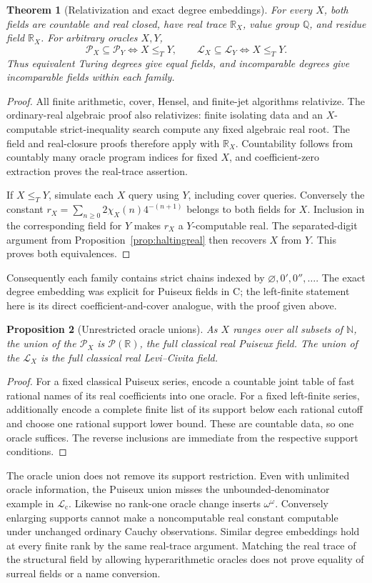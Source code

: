 \documentclass[11pt,letterpaper]{article}
\numberwithin{equation}{section}
\newtheorem{theorem}{Theorem}[section]
\newtheorem{proposition}[theorem]{Proposition}
\theoremstyle{definition}
\theoremstyle{remark}
\newcommand{\PP}{\mathcal P}
\newcommand{\Lc}{\mathcal L_{\mathrm c}}
\newcommand{\Q}{\mathbb Q}
\newcommand{\R}{\mathbb R}
\newcommand{\N}{\mathbb N}
\begin{document}
\begin{theorem}[Relativization and exact degree embeddings]
\label{thm:oracle-fields}
For every $X$, both fields are countable and real closed, have real trace
$\R_X$, value group $\Q$, and residue field $\R_X$.
For arbitrary oracles $X,Y$,
\[
 \mathcal P_X\subseteq\mathcal P_Y\iff X\le_TY,
 \qquad
 \mathcal L_X\subseteq\mathcal L_Y\iff X\le_TY.
\]
Thus equivalent Turing degrees give equal fields, and incomparable degrees
give incomparable fields within each family.
\end{theorem}
\begin{proof}
All finite arithmetic, cover, Hensel, and finite-jet algorithms relativize.
The ordinary-real algebraic proof also relativizes: finite isolating data
and an $X$-computable strict-inequality search compute any fixed algebraic
real root. The field and real-closure proofs therefore apply with $\R_X$.
Countability follows from countably many oracle program indices for fixed
$X$, and coefficient-zero extraction proves the real-trace assertion.

If $X\le_TY$, simulate each $X$ query using $Y$, including cover queries.
Conversely the constant
$r_X=\sum_{n\ge0}2\chi_X(n)4^{-(n+1)}$ belongs to both fields for $X$.
Inclusion in the corresponding field for $Y$ makes $r_X$ a $Y$-computable
real. The separated-digit argument from Proposition~\ref{prop:haltingreal}
then recovers $X$ from $Y$. This proves both equivalences.
\end{proof}
Consequently each family contains strict chains indexed by
$\varnothing,0',0'',\ldots$. The exact degree embedding was explicit for
Puiseux fields in C; the left-finite statement here is its direct
coefficient-and-cover analogue, with the proof given above.

\begin{proposition}[Unrestricted oracle unions]
\label{prop:oracle-unions}
As $X$ ranges over all subsets of $\N$, the union of the $\mathcal P_X$ is
$\PP(\R)$, the full classical real Puiseux field. The union of the
$\mathcal L_X$ is the full classical real Levi--Civita field.
\end{proposition}
\begin{proof}
For a fixed classical Puiseux series, encode a countable joint table of
fast rational names of its real coefficients into one oracle. For a fixed
left-finite series, additionally encode a complete finite list of its support
below each rational cutoff and choose one rational support lower bound.
These are countable data, so one oracle suffices. The reverse inclusions
are immediate from the respective support conditions.
\end{proof}
The oracle union does not remove its support restriction. Even with unlimited
oracle information, the Puiseux union misses the unbounded-denominator
example in $\Lc$. Likewise no rank-one oracle change inserts $\omega^\omega$.
Conversely enlarging supports cannot make a noncomputable real constant
computable under unchanged ordinary Cauchy observations. Similar degree
embeddings hold at every finite rank by the same real-trace argument.
Matching the real trace of the structural field by allowing hyperarithmetic
oracles does not prove equality of surreal fields or a name conversion.
\end{document}

